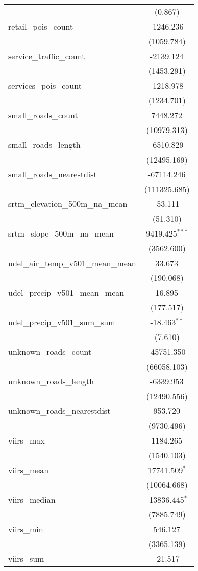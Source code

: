 \begin{table}[!htbp]
\begin{tabular}{@{\extracolsep{5pt}}lc}
  & (0.867) \\
 retail_pois_count & -1246.236$^{}$ \\
  & (1059.784) \\
 service_traffic_count & -2139.124$^{}$ \\
  & (1453.291) \\
 services_pois_count & -1218.978$^{}$ \\
  & (1234.701) \\
 small_roads_count & 7448.272$^{}$ \\
  & (10979.313) \\
 small_roads_length & -6510.829$^{}$ \\
  & (12495.169) \\
 small_roads_nearestdist & -67114.246$^{}$ \\
  & (111325.685) \\
 srtm_elevation_500m_na_mean & -53.111$^{}$ \\
  & (51.310) \\
 srtm_slope_500m_na_mean & 9419.425$^{***}$ \\
  & (3562.600) \\
 udel_air_temp_v501_mean_mean & 33.673$^{}$ \\
  & (190.068) \\
 udel_precip_v501_mean_mean & 16.895$^{}$ \\
  & (177.517) \\
 udel_precip_v501_sum_sum & -18.463$^{**}$ \\
  & (7.610) \\
 unknown_roads_count & -45751.350$^{}$ \\
  & (66058.103) \\
 unknown_roads_length & -6339.953$^{}$ \\
  & (12490.556) \\
 unknown_roads_nearestdist & 953.720$^{}$ \\
  & (9730.496) \\
 viirs_max & 1184.265$^{}$ \\
  & (1540.103) \\
 viirs_mean & 17741.509$^{*}$ \\
  & (10064.668) \\
 viirs_median & -13836.445$^{*}$ \\
  & (7885.749) \\
 viirs_min & 546.127$^{}$ \\
  & (3365.139) \\
 viirs_sum & -21.517$^{}$ \\

\end{tabular}
\end{table}

